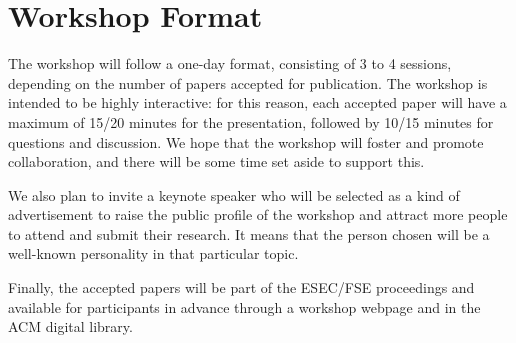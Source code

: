 \section{Workshop Format}
\label{sec:format}

The workshop will follow a one-day format, consisting of 3 to 4 sessions, depending on the number of papers accepted for publication.
The workshop is intended to be highly interactive: for this reason, each accepted paper will have a maximum of 15/20 minutes for the presentation, followed by 10/15 minutes for questions and discussion.
We hope that the workshop will foster and promote collaboration, and there will be some time set aside to support this.

We also plan to invite a keynote speaker who will be selected as a kind of advertisement to raise the public profile of the workshop and attract more people to attend and submit their research.
It means that the person chosen will be a well-known personality in that particular topic.

Finally, the accepted papers will be part of the ESEC/FSE proceedings and available for participants in advance through a workshop webpage and in the ACM digital library.
